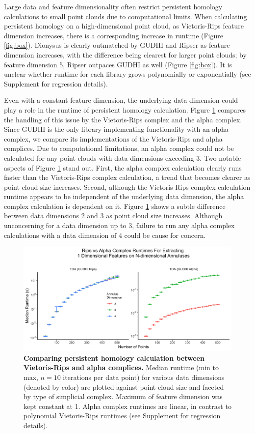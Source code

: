 Large data and feature dimensionality often restrict persistent
homology calculations to small point clouds due to computational limits.
When calculating persistent homology on a high-dimensional point cloud,
as Vietoris-Rips feature dimension increases, there is a corresponding
increase in runtime (Figure \ref{fig:box}). Dionysus is clearly
outmatched by GUDHI and Ripser as feature dimension increases, with the
difference being clearest for larger point clouds; by feature dimension
5, Ripser outpaces GUDHI as well (Figure \ref{fig:box}). It is unclear
whether runtime for each library grows polynomially or exponentially
(see Supplement for regression details).

Even with a constant feature dimension, the underlying data dimension
could play a role in the runtime of persistent homology calculation. Figure
\ref{fig:ann} compares the handling of this issue by the Vietoris-Rips
complex and the alpha complex. Since GUDHI is the only library
implementing functionality with an alpha complex, we compare its
implementations of the Vietoris-Rips and alpha complices. Due to
computational limitations, an alpha complex could not be calculated for
any point clouds with data dimensions exceeding 3. Two notable aspects of
Figure \ref{fig:ann} stand out. First, the alpha complex calculation
clearly runs faster than the Vietoris-Rips complex calculation, a trend
that becomes clearer as point cloud size increases. Second, although the
Vietoris-Rips complex calculation runtime appears to be independent of the underlying data dimension, the alpha complex calculation is dependent on it.
Figure \ref{fig:ann} shows a subtle difference between data dimensions 2
and 3 as point cloud size increases. Although unconcerning for a data
dimension up to 3, failure to run any alpha complex calculations with a
data dimension of 4 could be cause for concern.

\begin{figure}
  \centering
  \includegraphics[width=6in]{fig6.png}
  \caption{
    \textbf{Comparing persistent homology calculation between Vietoris-Rips and alpha complices.}
    Median runtime (min to max, $n=10$ iterations per data point) for various data dimensions (denoted by color) are plotted against point cloud size and faceted by type of simplicial complex.
    Maximum of feature dimension was kept constant at 1.
    Alpha complex runtimes are linear, in contrast to polynomial Vietoris-Rips runtimes (see Supplement for regression details).}
\label{fig:ann}
\end{figure}

